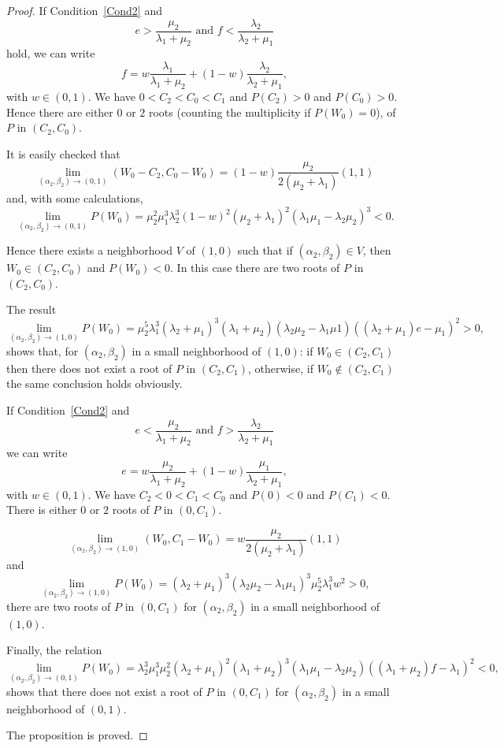 \documentclass[english]{amsart}
\numberwithin{proposition}{section}
\begin{document}
\begin{proof}
If Condition~\eqref{Cond2} and
\[
e>\frac{\mu_2}{\lambda_1{+}\mu_2} \text{ and } f< \frac{\lambda_2}{\lambda_2{+}\mu_1}
\]
hold, we can write
\[
f=w\frac{\lambda_1}{\lambda_1+\mu_2} +(1-w)\frac{\lambda_2}{\lambda_2{+}\mu_1},
\]
with $w{\in}(0,1)$. We have $0{<}C_2{<}C_0{<}C_1$ and $P(C_2){>}0$ and $P(C_0){>}0$. Hence there are either $0$ or $2$ roots (counting the multiplicity if $P(W_0){=}0$), of $P$ in $(C_2,C_0)$. 

It is easily checked that 
\[
\lim_{(\alpha_2,\beta_2)\to(0,1)} (W_0{-}C_2,C_0{-}W_0)=(1{-}w)\frac{\mu_2}{2(\mu_2{+}\lambda_1)}(1,1)
\]
and, with some calculations, 
\[
\lim_{(\alpha_2,\beta_2)\to(0,1)} P(W_0)=\mu_2^2\mu_1^3\lambda_2^3(1{-}w)^2(\mu_2{+}\lambda_1)^2(\lambda_1\mu_1{-}\lambda_2\mu_2)^3 <0. 
\]

Hence there exists a neighborhood $V$ of $(1,0)$ such that if $(\alpha_2,\beta_2){\in}V$, then $W_0{\in}(C_2,C_0)$ and $P(W_0)<0$. In this case there are two roots of $P$ in $(C_2,C_0)$.

The result
\[
\lim_{(\alpha_2,\beta_2)\to(1,0)} P(W_0)=\mu_2^5\lambda_1^3(\lambda_2{+}\mu_1)^3(\lambda_1{+}\mu_2)(\lambda_2\mu_2{-}\lambda_1\mu1)((\lambda_2{+}\mu_1)e{-}\mu_1)^2>0,
\]
shows that, for $(\alpha_2,\beta_2)$ in a small neighborhood of $(1,0)$: if $W_0{\in}(C_2,C_1)$ then there does not exist a root of $P$ in $(C_2,C_1)$, otherwise, if $W_0{\not\in}(C_2,C_1)$ the same conclusion holds obviously.

If Condition~\eqref{Cond2} and
\[
e<\frac{\mu_2}{\lambda_1{+}\mu_2} \text{ and } f>\frac{\lambda_2}{\lambda_2{+}\mu_1}
\]
we can write
\[
e=w\frac{\mu_2}{\lambda_1+\mu_2} +(1-w)\frac{\mu_1}{\lambda_2{+}\mu_1},
\]
with $w{\in}(0,1)$. We have $C_2{<}0{<}C_1{<}C_0$ and $P(0){<}0$ and $P(C_1){<}0$. There is either $0$ or $2$ roots of $P$ in $(0,C_1)$. 

\[
\lim_{(\alpha_2,\beta_2)\to(1,0)} (W_0,C_1{-}W_0)=w\frac{\mu_2}{2(\mu_2{+}\lambda_1)}(1,1)
\]
and
\[
\lim_{(\alpha_2,\beta_2)\to(1,0)} P(W_0)=(\lambda_2{+}\mu_1)^3(\lambda_2\mu_2{-}\lambda_1\mu_1)^3\mu_2^5\lambda_1^3w^2>0,
\]
there are two roots of $P$ in $(0,C_1)$ for $(\alpha_2,\beta_2)$ in a small neighborhood of $(1,0)$.

Finally, the relation
\[
\lim_{(\alpha_2,\beta_2)\to(0,1)} P(W_0)=\lambda_2^3\mu_1^3\mu_2^2(\lambda_2{+}\mu_1)^2(\lambda_1{+}\mu_2)^3(\lambda_1\mu_1{-}\lambda_2\mu_2)((\lambda_1{+}\mu_2)f{-}\lambda_1)^2<0,
\]
shows that there does not exist a root of $P$ in $(0,C_1)$ for $(\alpha_2,\beta_2)$ in a small neighborhood of $(0,1)$.

The proposition is proved.
\end{proof}
\printbibliography
\appendix
\end{document}
